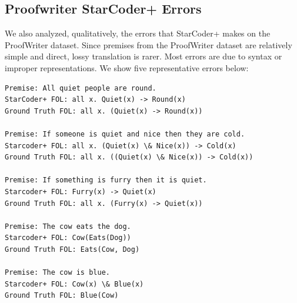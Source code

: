 \subsection{Proofwriter StarCoder+ Errors} \label{sec:appendix_proofwriter_errors}
We also analyzed, qualitatively, the errors that StarCoder+ makes on the ProofWriter dataset. Since premises from the ProofWriter dataset are relatively simple and direct, lossy translation is rarer. Most errors are due to syntax or improper representations. We show five representative errors below:

\begin{lstlisting}
Premise: All quiet people are round.
StarCoder+ FOL: all x. Quiet(x) -> Round(x)
Ground Truth FOL: all x. (Quiet(x) -> Round(x))

Premise: If someone is quiet and nice then they are cold.
Starcoder+ FOL: all x. (Quiet(x) \& Nice(x)) -> Cold(x)
Ground Truth FOL: all x. ((Quiet(x) \& Nice(x)) -> Cold(x))

Premise: If something is furry then it is quiet.
Starcoder+ FOL: Furry(x) -> Quiet(x)
Ground Truth FOL: all x. (Furry(x) -> Quiet(x))

Premise: The cow eats the dog.
Starcoder+ FOL: Cow(Eats(Dog))
Ground Truth FOL: Eats(Cow, Dog)

Premise: The cow is blue.
Starcoder+ FOL: Cow(x) \& Blue(x)
Ground Truth FOL: Blue(Cow)
\end{lstlisting}